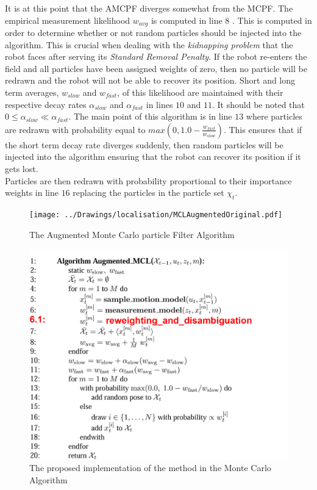 It is at this point that the AMCPF diverges somewhat from the MCPF. The empirical measurement likelihood $w_{avg}$ is computed in line $8$ \citep{Thrun2002}. This is computed in order to determine whether or not random particles should be injected into the algorithm. This is crucial when dealing with the \textit{kidnapping problem} that the robot faces after serving its \textit{Standard Removal Penalty}. If the robot re-enters the field and all particles have been assigned weights of zero, then no particle will be redrawn and the robot will not be able to recover its position. Short and long term averages, $w_{slow}$ and $w_{fast}$, of this likelihood are maintained with their respective decay rates $\alpha_{slow}$ and $\alpha_{fast}$ in lines $10$ and $11$. It should be noted that $0 \leq \alpha_{slow} \ll \alpha_{fast}$. The main point of this algorithm is in line $13$ where particles are redrawn with probability equal to $max(0, 1.0 - \frac{w_{fast}}{w_{slow}})$. This ensures that if the short term decay rate diverges suddenly, then random particles will be injected into the algorithm ensuring that the robot can recover its position if it gets lost.\\

Particles are then redrawn with probability proportional to their importance weights in line $16$ replacing the particles in the particle set $\chi_t$.  

\begin{figure}[ht!]
\begin{minipage}[b]{0.5\linewidth}
  \centering
    \texttt{[image: ../Drawings/localisation/MCLAugmentedOriginal.pdf]}
    \caption{The Augmented Monte Carlo particle Filter Algorithm}
    \label{fig:augmented}
\end{minipage}
\begin{minipage}[b]{0.5\linewidth}
  \centering
    \includegraphics[width=1.2\textwidth]{../Drawings/localisation/MCLAugmented.jpg}
    \caption{The proposed implementation of the method in the Monte Carlo Algorithm \citep{Thrun2002}}
    \label{fig:mclProposed}
\end{minipage}
\end{figure}


